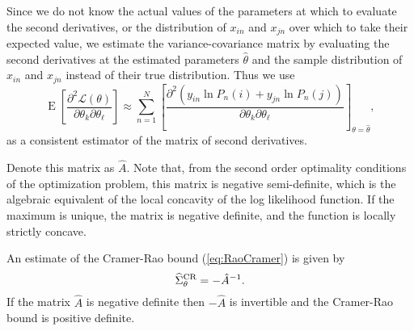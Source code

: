 \documentclass[12pt,a4paper]{article}
\newcommand{\req}[1]{(\ref{#1})}
\renewcommand{\L}{\mathcal{L}}
\newcommand{\expect}{\operatorname{E}}
\begin{document}
Since we do not know the actual values of the parameters at which to
evaluate the second derivatives, or the distribution of $x_{in}$ and
$x_{jn}$ over which to take their expected value, we estimate the
variance-covariance matrix by evaluating the second derivatives  at the estimated parameters
$\hat{\theta}$ and the sample distribution of $x_{in}$ and $x_{jn}$ instead of
 their true distribution. Thus we use
\begin{equation}
  \label{eq:BAL4.35}
  \expect\left[\frac{\partial^2 \L(\theta)}{\partial \theta_k \partial \theta_\ell}  \right]\approx \sum_{n=1}^N \left[\frac{\partial^2\left(y_{in}\ln P_n(i) + y_{jn} \ln P_n(j) \right)}{\partial \theta_k \partial \theta_\ell} \right]_{\theta=\hat{\theta}},
\end{equation}
as a consistent estimator of the matrix of second derivatives. 

Denote
this matrix as $\hat{A}$. Note that, from the second order optimality conditions of the optimization
problem, this matrix is negative semi-definite, which is the algebraic equivalent of the local  concavity of the
log likelihood function.
 If the maximum is unique, the matrix is negative definite, and the
 function is locally strictly concave. 




 An estimate of the Cramer-Rao
bound \req{eq:RaoCramer} is given by 
\begin{equation}
\label{eq:EstimateRaoCramer}
\widehat{\Sigma}^{\protect\text{CR}}_{\theta} = -\hat{A}^{-1}.
\end{equation}
If  the matrix $\hat{A}$ is  negative definite then $-\hat{A}$ is invertible and the Cramer-Rao bound is positive definite. 
\end{document}
